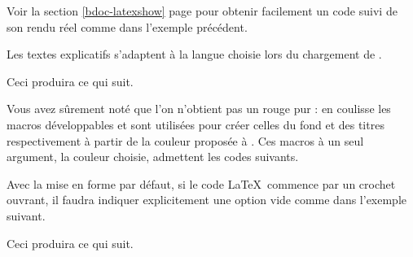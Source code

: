 \begin{bdocrem}
    Voir la section \ref{bdoc-latexshow} page \pageref{bdoc-latexshow} pour obtenir facilement un code suivi de son rendu réel comme dans l'exemple précédent.
\end{bdocrem}

\begin{bdocnote}
    Les textes explicatifs s'adaptent à la langue choisie lors du chargement de .
\end{bdocnote}




\begin{bdocexa}
    \leavevmode


    Ceci produira ce qui suit.

    \medskip

    
\end{bdocexa}


\begin{bdocnote}
    Vous avez sûrement noté que l'on n'obtient pas un rouge pur : en coulisse les macros développables  et  sont utilisées pour créer celles du fond et des titres respectivement à partir de la couleur proposée à .
	Ces macros à un seul argument, la couleur choisie, admettent les codes suivants.

	\begin{bdoclatex}[code]
	\end{bdoclatex}
\end{bdocnote}




\begin{bdocwarn}
    Avec la mise en forme par défaut, si le code \LaTeX\ commence par un crochet ouvrant, il faudra indiquer explicitement une option vide comme dans l'exemple suivant.


    Ceci produira ce qui suit.

    \medskip

    
\end{bdocwarn}



